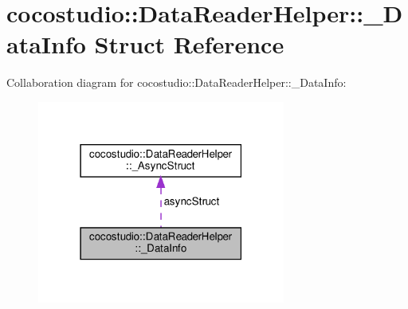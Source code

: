 \hypertarget{structcocostudio_1_1DataReaderHelper_1_1__DataInfo}{}\section{cocostudio\+:\+:Data\+Reader\+Helper\+:\+:\+\_\+\+Data\+Info Struct Reference}
\label{structcocostudio_1_1DataReaderHelper_1_1__DataInfo}


Collaboration diagram for cocostudio\+:\+:Data\+Reader\+Helper\+:\+:\+\_\+\+Data\+Info\+:
\nopagebreak
\begin{figure}[H]
\begin{center}
\leavevmode
\includegraphics[width=231pt]{structcocostudio_1_1DataReaderHelper_1_1__DataInfo__coll__graph}
\end{center}
\end{figure}
